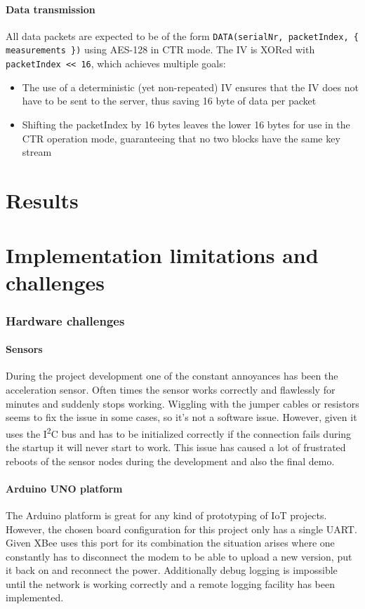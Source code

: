 \documentclass[a4paper,11pt]{scrartcl}
\begin{document}
\subsection{Data transmission}
All data packets are expected to be of the form \texttt{DATA(serialNr, packetIndex, \{ measurements \})} using AES-128 in CTR mode. The IV is XORed with \texttt{packetIndex << 16}, which achieves multiple goals:

\begin{itemize}
\item The use of a deterministic (yet non-repeated) IV ensures that the IV does not have to be sent to the server, thus saving 16 byte of data per packet
\item Shifting the packetIndex by 16 bytes leaves the lower 16 bytes for use in the CTR operation mode, guaranteeing that no two blocks have the same key stream
\end{itemize}

\part{Results}

\part{Implementation limitations and challenges}
\section{Hardware challenges}
\subsection{Sensors}\label{subsec:sensors}
During the project development one of the constant annoyances has been the acceleration sensor. Often times the sensor works correctly and flawlessly for minutes and suddenly stops working. Wiggling with the jumper cables or resistors seems to fix the issue in some cases, so it's not a software issue. However, given it uses the I\textsuperscript{2}C bus and has to be initialized correctly if the connection fails during the startup it will never start to work. This issue has caused a lot of frustrated reboots of the sensor nodes during the development and also the final demo.

\subsection{Arduino UNO platform}\label{subsec:uart}
The Arduino platform is great for any kind of prototyping of IoT projects. However, the chosen board configuration for this project only has a single UART. Given XBee uses this port for its combination the situation arises where one constantly has to disconnect the modem to be able to upload a new version, put it back on and reconnect the power. Additionally debug logging is impossible until the network is working correctly and a remote logging facility has been implemented.
\end{document}

